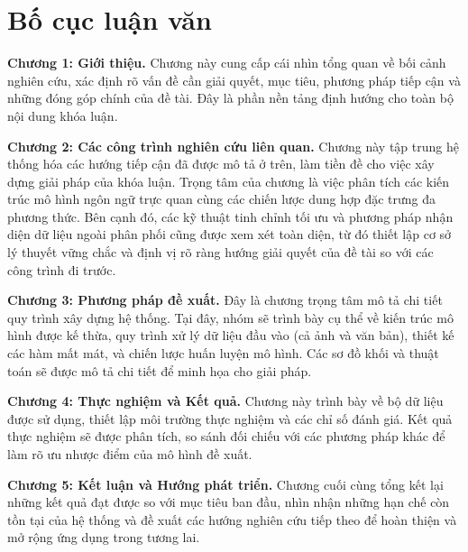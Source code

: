 \section{Bố cục luận văn}

\textbf{Chương 1: Giới thiệu.} Chương này cung cấp cái nhìn tổng quan về bối cảnh nghiên cứu, xác định rõ vấn đề cần giải quyết, mục tiêu, phương pháp tiếp cận và những đóng góp chính của đề tài. Đây là phần nền tảng định hướng cho toàn bộ nội dung khóa luận.

\textbf{Chương 2: Các công trình nghiên cứu liên quan.} Chương này tập trung hệ thống hóa các hướng tiếp cận đã được mô tả ở trên, làm tiền đề cho việc xây dựng giải pháp của khóa luận. Trọng tâm của chương là việc phân tích các kiến trúc mô hình ngôn ngữ trực quan cùng các chiến lược dung hợp đặc trưng đa phương thức. Bên cạnh đó, các kỹ thuật tinh chỉnh tối ưu và phương pháp nhận diện dữ liệu ngoài phân phối cũng được xem xét toàn diện, từ đó thiết lập cơ sở lý thuyết vững chắc và định vị rõ ràng hướng giải quyết của đề tài so với các công trình đi trước.

\textbf{Chương 3: Phương pháp đề xuất.} Đây là chương trọng tâm mô tả chi tiết quy trình xây dựng hệ thống. Tại đây, nhóm sẽ trình bày cụ thể về kiến trúc mô hình được kế thừa, quy trình xử lý dữ liệu đầu vào (cả ảnh và văn bản), thiết kế các hàm mất mát, và chiến lược huấn luyện mô hình. Các sơ đồ khối và thuật toán sẽ được mô tả chi tiết để minh họa cho giải pháp.

\textbf{Chương 4: Thực nghiệm và Kết quả.} Chương này trình bày về bộ dữ liệu được sử dụng, thiết lập môi trường thực nghiệm và các chỉ số đánh giá. Kết quả thực nghiệm sẽ được phân tích, so sánh đối chiếu với các phương pháp khác để làm rõ ưu nhược điểm của mô hình đề xuất.

\textbf{Chương 5: Kết luận và Hướng phát triển.} Chương cuối cùng tổng kết lại những kết quả đạt được so với mục tiêu ban đầu, nhìn nhận những hạn chế còn tồn tại của hệ thống và đề xuất các hướng nghiên cứu tiếp theo để hoàn thiện và mở rộng ứng dụng trong tương lai.
